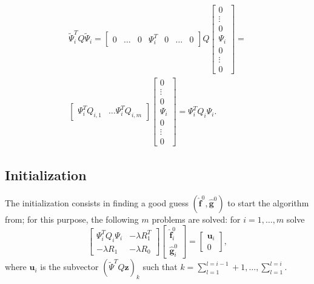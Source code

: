 \begin{equation}
	\begin{split}
		\tilde{\Psi}^T_iQ\tilde{\Psi}_i=
		\begin{bmatrix}
			0 & \dots & 0 & \Psi_i^T & 0 & \dots & 0
		\end{bmatrix}
		Q
		\begin{bmatrix}
			0      \\
			\vdots \\
			0      \\
			\Psi_i \\
			0      \\
			\vdots \\
			0
		\end{bmatrix}
		=\\
		\begin{bmatrix}
			\Psi^T_i Q_{i,1} & \dots \Psi^T_i Q_{i,m}
		\end{bmatrix}
		\begin{bmatrix}
			0      \\
			\vdots \\
			0      \\
			\Psi_i \\
			0      \\
			\vdots \\
			0
		\end{bmatrix}
		= \Psi_i^T Q_i \Psi_i.
	\end{split}
\end{equation}

\subsection{Initialization}
The initialization consists in finding a good guess
$(\hat{\bm{f}}^0,\hat{\bm{g}}^0)$ to start the algorithm from; for this
purpose, the following $m$ problems are solved: for $i = 1, \dots, m$ solve
\begin{equation}
	\begin{bmatrix}
		\Psi^T_i Q_i \Psi_i & -\lambda R_1^T \\
		-\lambda R_1        & -\lambda R_0
	\end{bmatrix}
	\begin{bmatrix}
		\hat{\bm{f}}_i^0 \\
		\hat{\bm{g}}_i^0
	\end{bmatrix}
	=
	\begin{bmatrix}
		\bm{u}_i \\
		0
	\end{bmatrix}
	,
\end{equation}
where $\bm{u}_i$ is the subvector $\left( \tilde{\Psi}^T Q\bm{z}
	\right)_k$ such that $k=\sum_{l=1}^{l=i-1} + 1, \dots,\sum_{l=1}^{l=i}$.

